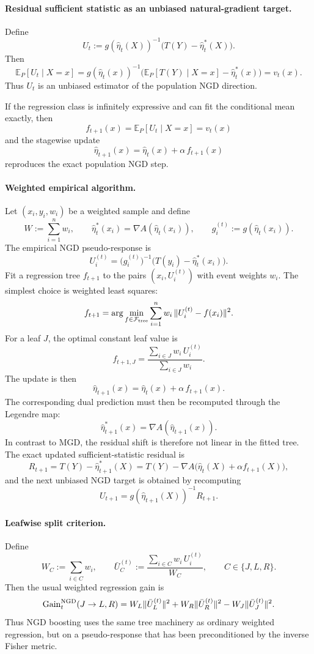 \documentclass[11pt]{article}
\begin{document}
\paragraph{Residual sufficient statistic as an unbiased natural-gradient target.}
Define
\[
U_t:=g(\hat\eta_t(X))^{-1}\Big(T(Y)-\hat\eta_t^\ast(X)\Big).
\]
Then
\[
\mathbb E_P[U_t\mid X=x]
=
g(\hat\eta_t(x))^{-1}\Big(\mathbb E_P[T(Y)\mid X=x]-\hat\eta_t^\ast(x)\Big)
=
v_t(x).
\]
Thus \(U_t\) is an unbiased estimator of the population NGD direction.

If the regression class is infinitely expressive and can fit the conditional mean exactly, then
\[
f_{t+1}(x)=\mathbb E_P[U_t\mid X=x]=v_t(x)
\]
and the stagewise update
\[
\hat\eta_{t+1}(x)=\hat\eta_t(x)+\alpha\,f_{t+1}(x)
\]
reproduces the exact population NGD step.

\paragraph{Weighted empirical algorithm.}
Let \((x_i,y_i,w_i)\) be a weighted sample and define
\[
W:=\sum_{i=1}^n w_i,
\qquad
\hat\eta_t^\ast(x_i)=\nabla A(\hat\eta_t(x_i)),
\qquad
g_i^{(t)}:=g(\hat\eta_t(x_i)).
\]
The empirical NGD pseudo-response is
\[
U_i^{(t)}
=
\bigl(g_i^{(t)}\bigr)^{-1}\Big(T(y_i)-\hat\eta_t^\ast(x_i)\Big).
\]
Fit a regression tree \(f_{t+1}\) to the pairs \((x_i,U_i^{(t)})\) with event weights \(w_i\). The simplest choice is weighted least squares:
\[
f_{t+1}
=
\arg\min_{f\in\mathcal F_{\rm tree}}
\sum_{i=1}^n w_i\,\|U_i^{(t)}-f(x_i)\|^2.
\]
For a leaf \(J\), the optimal constant leaf value is
\[
f_{t+1,J}
=
\frac{\sum_{i\in J} w_i\,U_i^{(t)}}{\sum_{i\in J} w_i}.
\]
The update is then
\[
\hat\eta_{t+1}(x)=\hat\eta_t(x)+\alpha\,f_{t+1}(x).
\]
The corresponding dual prediction must then be recomputed through the Legendre map:
\[
\hat\eta_{t+1}^\ast(x)=\nabla A(\hat\eta_{t+1}(x)).
\]
In contrast to MGD, the residual shift is therefore not linear in the fitted tree. The exact updated sufficient-statistic residual is
\[
R_{t+1}=T(Y)-\hat\eta_{t+1}^\ast(X)
=
T(Y)-\nabla A\bigl(\hat\eta_t(X)+\alpha f_{t+1}(X)\bigr),
\]
and the next unbiased NGD target is obtained by recomputing
\[
U_{t+1}=g(\hat\eta_{t+1}(X))^{-1}R_{t+1}.
\]

\paragraph{Leafwise split criterion.}
Define
\[
W_C:=\sum_{i\in C}w_i,
\qquad
\bar U_C^{(t)}
:=
\frac{\sum_{i\in C}w_i\,U_i^{(t)}}{W_C},
\qquad
C\in\{J,L,R\}.
\]
Then the usual weighted regression gain is
\[
\mathrm{Gain}^{\rm NGD}_t(J\to L,R)
=
W_L\|\bar U_L^{(t)}\|^2
+
W_R\|\bar U_R^{(t)}\|^2
-
W_J\|\bar U_J^{(t)}\|^2.
\]
Thus NGD boosting uses the same tree machinery as ordinary weighted regression, but on a pseudo-response that has been preconditioned by the inverse Fisher metric.
\end{document}
